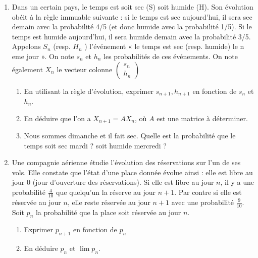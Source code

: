 \documentclass[12pt,a4paper]{article}
\begin{document}
\begin{enumerate}
Quelle est la probabilité qu'une personne dépistée positive soit effectivement malade? 

Quelle est la probabilité qu'une personne dépistée négative soit effectivement malade?
\item
Dans un certain pays, le temps est soit sec (S) soit humide (H). Son évolution obéit à la règle immuable suivante : si le temps est sec aujourd'hui, il sera sec demain avec la probabilité 4/5 (et donc humide avec la probabilité 1/5). Si le temps est humide aujourd'hui, il sera humide demain avec la probabilité 3/5. Appelons $S_n$ (resp. $H_n$ ) l'événement « le temps est sec (resp. humide) le n eme jour ». On note $s_n$ et $h_n$ les probabilités de ces événements. On note également $X_n$ le vecteur colonne $\left(\begin{array}{c}s_n\\h_n \end{array}\right)$
\begin{enumerate}
	\item
	En utilisant la règle d'évolution, exprimer $s_{n+1},h_{n+1}$ en fonction de $s_n$ et $h_n$. 
	\item
	En déduire que l'on a $X_{n+1}=AX_n$, où $A$ est une matrice à déterminer. 
	\item
	Nous sommes dimanche et il fait sec. Quelle est la probabilité que le temps soit sec mardi ? soit humide mercredi ? 
\end{enumerate}

\item Une compagnie a\'erienne \'etudie l'\'evolution des r\'eservations 
sur l'un de ses vols. Elle constate que 
l'\'etat d'une place donn\'ee \'evolue ainsi : elle est libre au jour 0 (jour d'ouverture des r\'eservations).
 Si elle est libre au jour $n$, il y a une probabilit\'e 
 $\frac{4}{10}$ que quelqu'un la r\'eserve au jour $n+1$.
 Par contre si elle est r\'eserv\'ee au jour $n$, 
 elle reste r\'eserv\'ee au jour $n+1$ avec une probabilit\'e 
 $\frac{9}{10}$. Soit $p_n$ la probabilit\'e 
 que la place soit r\'eserv\'ee au jour $n$.
 \begin{enumerate}
 \item Exprimer $p_{n+1}$ en fonction de $p_n$
 \item En d\'eduire $p_n$ et $\lim p_n$.
 \end{enumerate}
 

\end{enumerate}
\end{document}
